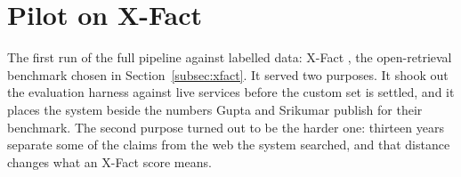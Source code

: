 

\section{Pilot on X-Fact}
\label{sec:results-pilot}

The first run of the full pipeline against labelled data: X-Fact
\cite{gupta2021xfact}, the open-retrieval benchmark chosen in
Section~\ref{subsec:xfact}. It served two purposes. It shook out the
evaluation harness against live services before the custom set is
settled, and it places the system beside the numbers Gupta and
Srikumar publish for their benchmark. The second purpose turned out to
be the harder one: thirteen years separate some of the claims from the
web the system searched, and that distance changes what an X-Fact
score means.








